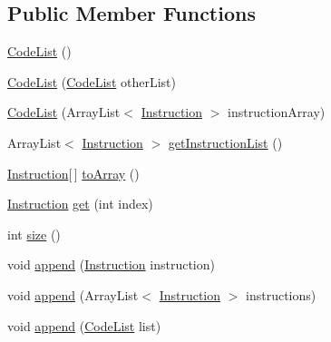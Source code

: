 \subsection*{Public Member Functions}
\begin{DoxyCompactItemize}
\item 
\hyperlink{classcas_1_1parser_1_1parser__containers_1_1_code_list_a6ddc761881342b6ec9ed3e202eb9e13c}{Code\-List} ()
\item 
\hyperlink{classcas_1_1parser_1_1parser__containers_1_1_code_list_a71addf91d1c62a09e8838f50bdd28f6f}{Code\-List} (\hyperlink{classcas_1_1parser_1_1parser__containers_1_1_code_list}{Code\-List} other\-List)
\item 
\hyperlink{classcas_1_1parser_1_1parser__containers_1_1_code_list_a1ad0745dfaea07e2f9ca1160e8f11852}{Code\-List} (Array\-List$<$ \hyperlink{classcas_1_1instruction_1_1_instruction}{Instruction} $>$ instruction\-Array)
\item 
Array\-List$<$ \hyperlink{classcas_1_1instruction_1_1_instruction}{Instruction} $>$ \hyperlink{classcas_1_1parser_1_1parser__containers_1_1_code_list_ae8e046c8a8c9d2c494b4b3ae73255181}{get\-Instruction\-List} ()
\item 
\hyperlink{classcas_1_1instruction_1_1_instruction}{Instruction}\mbox{[}$\,$\mbox{]} \hyperlink{classcas_1_1parser_1_1parser__containers_1_1_code_list_a6d2ad7bcdb310e57ad7015fec8a31b18}{to\-Array} ()
\item 
\hyperlink{classcas_1_1instruction_1_1_instruction}{Instruction} \hyperlink{classcas_1_1parser_1_1parser__containers_1_1_code_list_af4112f3cfa8351a163f2d3beca017085}{get} (int index)
\item 
int \hyperlink{classcas_1_1parser_1_1parser__containers_1_1_code_list_ac62b7f02ab81c23688c1dbc4c13ec79b}{size} ()
\item 
void \hyperlink{classcas_1_1parser_1_1parser__containers_1_1_code_list_a8b8f38668a8e672c0ddf93c841380d68}{append} (\hyperlink{classcas_1_1instruction_1_1_instruction}{Instruction} instruction)
\item 
void \hyperlink{classcas_1_1parser_1_1parser__containers_1_1_code_list_a737e0eb573359698781fbf528bcccd54}{append} (Array\-List$<$ \hyperlink{classcas_1_1instruction_1_1_instruction}{Instruction} $>$ instructions)
\item 
void \hyperlink{classcas_1_1parser_1_1parser__containers_1_1_code_list_ac6c07c1c4c3fc025ec598f6bb60cdfdf}{append} (\hyperlink{classcas_1_1parser_1_1parser__containers_1_1_code_list}{Code\-List} list)
\item 

\end{DoxyCompactItemize}
